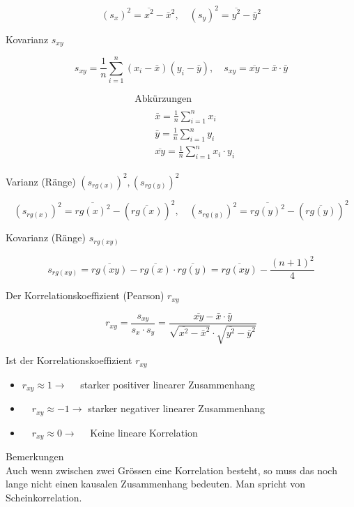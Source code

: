 \documentclass[10pt]{article}
\begin{document}
$$
\left(s_{x}\right)^{2}=\overline{x^{2}}-\bar{x}^{2}, \quad\left(s_{y}\right)^{2}=\overline{y^{2}}-\bar{y}^{2}
$$

Kovarianz $s_{x y}$

$$
s_{x y}=\frac{1}{n} \sum_{i=1}^{n}\left(x_{i}-\bar{x}\right)\left(y_{i}-\bar{y}\right), \quad s_{x y}=\overline{x y}-\bar{x} \cdot \bar{y}
$$

$$
\begin{aligned}
& \text { Abkürzungen } \\
& \qquad \begin{array}{c}
\bar{x}=\frac{1}{n} \sum_{i=1}^{n} x_{i} \\
\bar{y}=\frac{1}{n} \sum_{i=1}^{n} y_{i} \\
\overline{x y}=\frac{1}{n} \sum_{i=1}^{n} x_{i} \cdot y_{i}
\end{array}
\end{aligned}
$$

Varianz (Ränge) $\left(s_{r g(x)}\right)^{2},\left(s_{r g(y)}\right)^{2}$

$$
\left(s_{r g(x)}\right)^{2}=\overline{r g(x)^{2}}-(\overline{r g(x)})^{2}, \quad\left(s_{r g(y)}\right)^{2}=\overline{r g(y)^{2}}-(\overline{r g(y)})^{2}
$$

Kovarianz (Ränge) $s_{r g(x y)}$

$$
s_{r g(x y)}=\overline{r g(x y)}-\overline{r g(x)} \cdot \overline{r g(y)}=\overline{r g(x y)}-\frac{(n+1)^{2}}{4}
$$

Der Korrelationskoeffizient (Pearson) $r_{x y}$

$$
r_{x y}=\frac{s_{x y}}{s_{x} \cdot s_{y}}=\frac{\overline{x y}-\bar{x} \cdot \bar{y}}{\sqrt{\overline{x^{2}}-\bar{x}^{2}} \cdot \sqrt{\overline{y^{2}}-\bar{y}^{2}}}
$$

Ist der Korrelationskoeffizient $r_{x y}$

\begin{itemize}
  \item $r_{x y} \approx 1 \rightarrow \quad$ starker positiver linearer Zusammenhang
  \item $\quad r_{x y} \approx-1 \rightarrow$ starker negativer linearer Zusammenhang
  \item $\quad r_{x y} \approx 0 \rightarrow \quad$ Keine lineare Korrelation
\end{itemize}

Bemerkungen\\
Auch wenn zwischen zwei Grössen eine Korrelation besteht, so muss das noch lange nicht einen kausalen Zusammenhang bedeuten. Man spricht von Scheinkorrelation.
\end{document}
